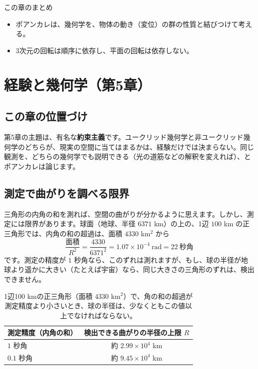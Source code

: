 \documentclass[a4paper,11pt,openany]{ltjsbook}
\begin{document}
\begin{pointbox}{この章のまとめ}
\begin{itemize}[leftmargin=*]
\item ポアンカレは、幾何学を、物体の動き（変位）の群の性質と結びつけて考える。
\item 3次元の回転は順序に依存し、平面の回転は依存しない。
\end{itemize}
\end{pointbox}

\chapter{経験と幾何学（第5章）}

\section{この章の位置づけ}

第5章の主題は、有名な\textbf{約束主義}です。ユークリッド幾何学と非ユークリッド幾何学のどちらが、現実の空間に当てはまるかは、経験だけでは決まらない。同じ観測を、どちらの幾何学でも説明できる（光の道筋などの解釈を変えれば）、とポアンカレは論じます。

\section{測定で曲がりを調べる限界}

三角形の内角の和を測れば、空間の曲がりが分かるように思えます。しかし、測定には限界があります。球面（地球、半径 $6371$ km）の上の、1辺 $100$ km の正三角形では、内角の和の超過は、面積 $4330$ km$^2$ から
\[
\frac{\text{面積}}{R^2}=\frac{4330}{6371^2}=1.07\times10^{-4}\ \text{rad}=22\ \text{秒角}
\]
です。測定の精度が $1$ 秒角なら、このずれは測れますが、もし、球の半径が地球より遥かに大きい（たとえば宇宙）なら、同じ大きさの三角形のずれは、検出できません。

\begin{table}[htbp]
\centering
\begin{tabular}{lc}
\toprule
測定精度（内角の和） & 検出できる曲がりの半径の上限 $R$\\
\midrule
$1$ 秒角 & 約 $2.99\times10^{4}$ km\\
$0.1$ 秒角 & 約 $9.45\times10^{4}$ km\\
\bottomrule
\end{tabular}
\caption{1辺100 kmの正三角形（面積 $4330$ km$^2$）で、角の和の超過が測定精度より小さいとき、球の半径は、少なくともこの値以上でなければならない。}
\end{table}
\end{document}
